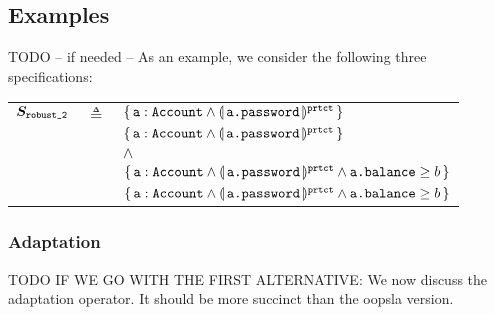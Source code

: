 \subsection{Examples}
\noindent
TODO -- if needed -- As an example, we consider the following three  specifications:

\begin{tabular}{lcl}
$\boldmath{S}_{{\texttt{robust$\_{{\texttt{2}}}$}}}$ &  $\triangleq$   & ${\{}\, {\texttt{a}}:{\texttt{Account}} \wedge \llparenthesis \, {\texttt{a.password}}\, \rrparenthesis^{{\texttt{prtct}}} \,{\}} $
 \\
   & & ${\{}\, {\texttt{a}}:{\texttt{Account}} \wedge \llparenthesis \, {\texttt{a.password}}\, \rrparenthesis^{{\texttt{prtct}}} \,{\}} $
 \\
   & & $\wedge$ \\
   & & ${\{}\, {\texttt{a}}:{\texttt{Account}} \wedge \llparenthesis \, {\texttt{a.password}}\, \rrparenthesis^{{\texttt{prtct}}} \wedge {\texttt{a.balance}}\geq b \,{\}} $
 \\
    & & ${\{}\, {\texttt{a}}:{\texttt{Account}} \wedge \llparenthesis \, {\texttt{a.password}}\, \rrparenthesis^{{\texttt{prtct}}}\wedge {\texttt{a.balance}}\geq b \,{\}} $
\end{tabular}


\subsubsection{Adaptation}
\label{sub:adapt:full}
TODO IF WE GO WITH THE FIRST ALTERNATIVE: We  now discuss  the adaptation operator.  It should be more succinct than the oopsla version.